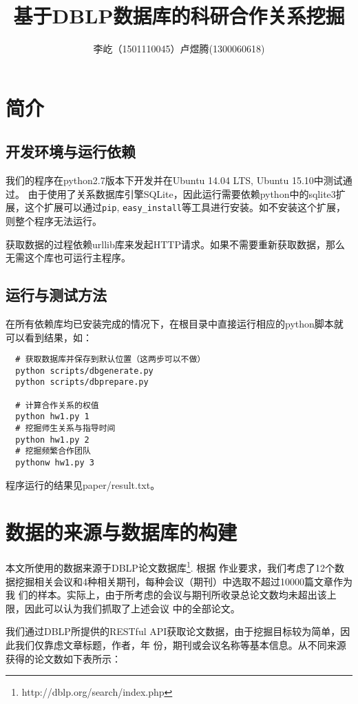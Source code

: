 \documentclass[a4paper]{article}
\title{基于DBLP数据库的科研合作关系挖掘}
\author{ 李屹（1501110045）卢煜腾(1300060618)}
\begin{document}
\maketitle

\section{简介} 
\subsection{开发环境与运行依赖}
我们的程序在python2.7版本下开发并在Ubuntu 14.04 LTS, Ubuntu 15.10中测试通过。
由于使用了关系数据库引擎SQLite，因此运行需要依赖python中的sqlite3扩展，这个扩展可以通过\texttt{pip},
\texttt{easy\_install}等工具进行安装。如不安装这个扩展，则整个程序无法运行。

获取数据的过程依赖urllib库来发起HTTP请求。如果不需要重新获取数据，那么无需这个库也可运行主程序。

\subsection{运行与测试方法}
在所有依赖库均已安装完成的情况下，在根目录中直接运行相应的python脚本就可以看到结果，如：
\begin{verbatim}
  # 获取数据库并保存到默认位置（这两步可以不做）
  python scripts/dbgenerate.py
  python scripts/dbprepare.py

  # 计算合作关系的权值
  python hw1.py 1
  # 挖掘师生关系与指导时间
  python hw1.py 2
  # 挖掘频繁合作团队
  pythonw hw1.py 3
\end{verbatim}
程序运行的结果见paper/result.txt。

\section{数据的来源与数据库的构建}
本文所使用的数据来源于DBLP论文数据库\footnote{http://dblp.org/search/index.php}. 根据
作业要求，我们考虑了12个数据挖掘相关会议和4种相关期刊，每种会议（期刊）中选取不超过10000篇文章作为我
们的样本。实际上，由于所考虑的会议与期刊所收录总论文数均未超出该上限，因此可以认为我们抓取了上述会议
中的全部论文。

我们通过DBLP所提供的RESTful API获取论文数据，由于挖掘目标较为简单，因此我们仅靠虑文章标题，作者，年
份，期刊或会议名称等基本信息。从不同来源获得的论文数如下表所示：
\end{document}
